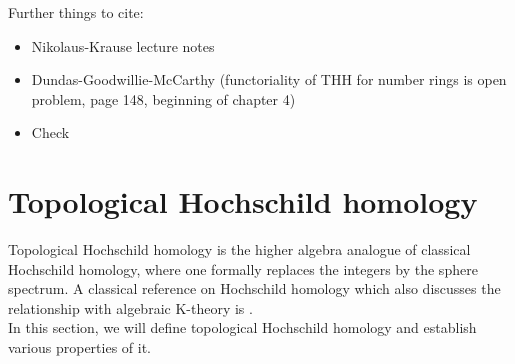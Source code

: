 Further things to cite:
\begin{itemize}
    \item Nikolaus-Krause lecture notes \cite{krausenikolausTCnotes} 
    \item Dundas-Goodwillie-McCarthy (functoriality of THH for number rings is open problem, page 148, beginning of chapter 4)
    \cite[148]{DundasGoodwillieMccarthyLocalstructure}
    \item Check \cite[Chapter~2]{HMlocalfields}
\end{itemize}




\section{Topological Hochschild homology}\label{THH}
Topological Hochschild homology is the higher algebra analogue of classical Hochschild homology, where one formally replaces the integers by the sphere spectrum. A classical reference on Hochschild homology which also discusses the relationship with algebraic K-theory is \cite{loday2013cyclic}.\\
In this section, we will define topological Hochschild homology and establish various properties of it.

